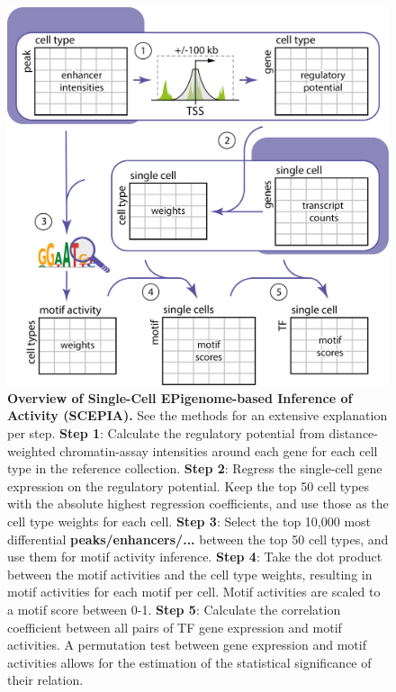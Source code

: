 \begin{figure}
    \centering
    \includegraphics[width=1\linewidth]{ch.scepia/imgs/20231106_OverviewFigure_SvH_v5.png}
    \caption{\textbf{Overview of Single-Cell EPigenome-based Inference of Activity (SCEPIA).} See the methods for an extensive explanation per step. \newline 
    \textbf{Step 1}: Calculate the regulatory potential from distance-weighted chromatin-assay intensities around each gene for each cell type in the reference collection.
    \textbf{Step 2}: Regress the single-cell gene expression on the regulatory potential. Keep the top 50 cell types with the absolute highest regression coefficients, and use those as the cell type weights for each cell.
    \textbf{Step 3}: Select the top 10,000 most differential \textbf{peaks/enhancers/...} between the top 50 cell types, and use them for motif activity inference.
    \textbf{Step 4}: Take the dot product between the motif activities and the cell type weights, resulting in motif activities for each motif per cell. Motif activities are scaled to a motif score between 0-1. 
    \textbf{Step 5}: Calculate the correlation coefficient between all pairs of TF gene expression and motif activities. A permutation test between gene expression and motif activities allows for the estimation of the statistical significance of their relation.}
    \label{fig:scepia_overview}
\end{figure}

